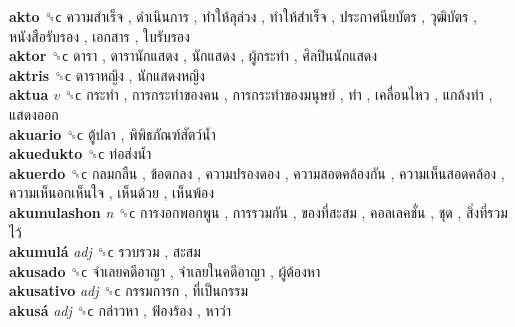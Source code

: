 \textbf{akto} ␝ϲ   ความสำเร็จ ,  ดำเนินการ ,  ทำให้ลุล่วง ,  ทำให้สำเร็จ ,  ประกาศนียบัตร ,  วุฒิบัตร ,  หนังสือรับรอง ,  เอกสาร ,  ใบรับรอง   \\
\textbf{aktor} ␝ϲ   ดารา ,  ดารานักแสดง ,  นักแสดง ,  ผู้กระทำ ,  ศิลปินนักแสดง   \\
\textbf{aktris} ␝ϲ   ดาราหญิง ,  นักแสดงหญิง   \\
\textbf{aktua} \emph{v}  ␝ϲ   กระทำ ,  การกระทำของคน ,  การกระทำของมนุษย์ ,  ทำ ,  เคลื่อนไหว ,  แกล้งทำ ,  แสดงออก   \\
\textbf{akuario} ␝ϲ   ตู้ปลา ,  พิพิธภัณฑ์สัตว์น้ำ   \\
\textbf{akuedukto} ␝ϲ   ท่อส่งน้ำ   \\
\textbf{akuerdo} ␝ϲ   กลมกลืน ,  ข้อตกลง ,  ความปรองดอง ,  ความสอดคล้องกัน ,  ความเห็นสอดคล้อง ,  ความเห็นอกเห็นใจ ,  เห็นด้วย ,  เห็นพ้อง   \\
\textbf{akumulashon} \emph{n}  ␝ϲ   การงอกพอกพูน ,  การรวมกัน ,  ของที่สะสม ,  คอลเลคชั่น ,  ชุด ,  สิ่งที่รวมไว้   \\
\textbf{akumulá} \emph{adj}  ␝ϲ   รวบรวม ,  สะสม   \\
\textbf{akusado} ␝ϲ   จำเลยคดีอาญา ,  จำเลยในคดีอาญา ,  ผู้ต้องหา   \\
\textbf{akusativo} \emph{adj}  ␝ϲ   กรรมการก ,  ที่เป็นกรรม   \\
\textbf{akusá} \emph{adj}  ␝ϲ   กล่าวหา ,  ฟ้องร้อง ,  หาว่า   \\
